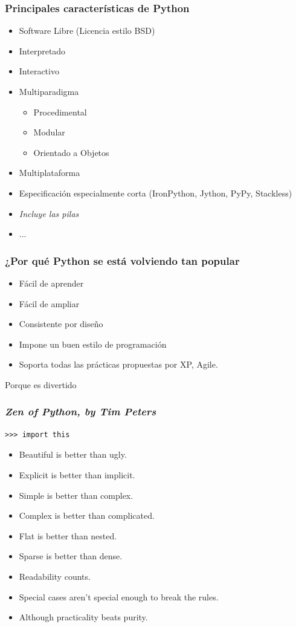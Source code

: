 \documentclass{beamer}
\begin{document}
\begin{frame}
 \frametitle{Principales características de Python}

\begin{itemize}
 \item Software Libre (Licencia estilo BSD)
 \item Interpretado
 \item Interactivo
 \item Multiparadigma
 \begin{itemize}
  \item Procedimental
  \item Modular
  \item Orientado a Objetos
 \end{itemize}
 \item Multiplataforma
 \item Especificación especialmente corta (IronPython, Jython, PyPy, Stackless)
 \item \emph{Incluye las pilas}
 \item ...
\end{itemize}

\end{frame}

\begin{frame}
 \frametitle{¿Por qué Python se está volviendo tan popular}
\begin{itemize}
 \item Fácil de aprender
 \item Fácil de ampliar
 \item Consistente por diseño
 \item Impone un buen estilo de programación
 \item Soporta todas las prácticas propuestas por XP, Agile.
\end{itemize}
\begin{center}
 Porque es divertido
\end{center}

\end{frame}

\begin{frame}[containsverbatim]
\frametitle{\emph{Zen of Python, by Tim Peters}}

\begin{verbatim}
>>> import this
\end{verbatim}

\begin{itemize}
 \item Beautiful is better than ugly.
 \item Explicit is better than implicit.
 \item Simple is better than complex.
 \item Complex is better than complicated.
 \item Flat is better than nested.
 \item Sparse is better than dense.
 \item Readability counts.
 \item Special cases aren't special enough to break the rules.
 \item Although practicality beats purity.
\end{itemize}
\end{frame}
\end{document}

